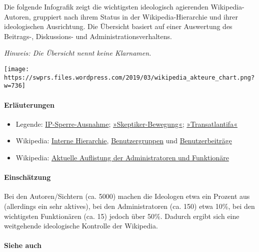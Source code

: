 Die folgende Infografik zeigt die wichtigsten ideologisch agierenden
Wiki­pedia-Autoren, gruppiert nach ihrem Status in der
Wikipedia-Hierarchie und ihrer ideologischen Ausrichtung. Die Übersicht
basiert auf einer Auswertung des Beitrags-, Diskussions- und
Administrations­verhaltens.

\emph{Hinweis: Die Übersicht nennt keine Klarnamen.}

\texttt{[image: https://swprs.files.wordpress.com/2019/03/wikipedia\_akteure\_chart.png?w=736]}

\hypertarget{erluxe4uterungen}{%
\paragraph{Erläuterungen}\label{erluxe4uterungen}}

\begin{itemize}
\tightlist
\item
  Legende:
  \href{https://de.wikipedia.org/wiki/Wikipedia:IP-Sperre-Ausnahme}{IP-Sperre-Ausnahme};
  \href{http://de.pluspedia.org/wiki/Gesellschaft_zur_wissenschaftlichen_Untersuchung_von_Parawissenschaften_(GWUP)}{»Skeptiker-Bewegung«};
  \href{https://de.wikipedia.org/wiki/Antideutsche}{»Transatlantifa«}
\item
  Wikipedia:
  \href{https://commons.wikimedia.org/wiki/File:Vereinfachtes_Benutzergruppenschema_dewiki.svg}{Interne
  Hierarchie},
  \href{https://de.wikipedia.org/wiki/Hilfe:Benutzer}{Benutzergruppen}
  und
  \href{https://de.wikipedia.org/wiki/Spezial:Beitr\%C3\%A4ge}{Benutzerbeiträge}
\item
  Wikipedia:
  \href{https://de.wikipedia.org/wiki/Wikipedia:Liste_der_Administratoren}{Aktuelle
  Auflistung der Administratoren und Funktionäre}
\end{itemize}

\hypertarget{einschuxe4tzung}{%
\paragraph{Einschätzung}\label{einschuxe4tzung}}

Bei den Autoren/Sichtern (ca. 5000) machen die Ideologen etwa ein
Prozent aus (allerdings ein sehr aktives), bei den Administratoren (ca.
150) etwa 10\%, bei den wichtigsten Funktionären (ca. 15) jedoch über
50\%. Dadurch ergibt sich eine weitgehende ideologische Kontrolle der
Wikipedia.

\hypertarget{siehe-auch}{%
\paragraph{Siehe auch}\label{siehe-auch}}

